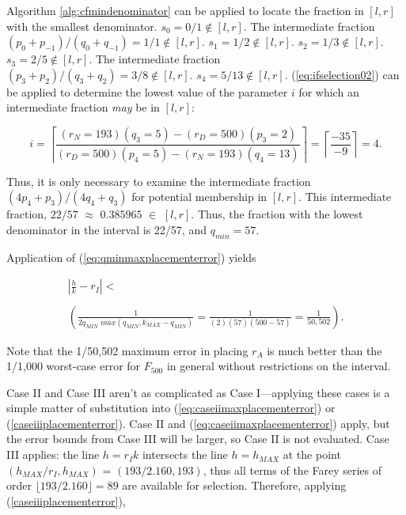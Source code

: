 \documentclass{esub2acm}
\begin{document}
Algorithm \ref{alg:cfmindenominator} can be applied to locate the fraction
in $[l,r]$ with the smallest denominator.  $s_0 =0/1 \notin [l,r]$.  The intermediate fraction
$(p_0 + p_{-1})/(q_0 + q_{-1})=1/1 \notin [l,r]$. $s_1 = 1/2 \notin [l,r]$.
$s_2 = 1/3 \notin [l,r]$.  $s_3 = 2/5 \notin [l,r]$.  The intermediate fraction
$(p_3 + p_2)/(q_3 + q_2)=3/8 \notin [l,r]$.  $s_4 = 5/13 \notin [l,r]$.
(\ref{eq:ifselection02}) can be applied to determine the lowest value of the
parameter $i$ for which an intermediate fraction \emph{may} be in $[l,r]$:

\begin{equation}
i = \left\lceil {
\frac
{(r_N = 193)(q_3 = 5) - (r_D = 500)(p_3=2)}
{(r_D=500)(p_4 = 5)-(r_N=193)(q_4=13)}
} \right\rceil
=
\left\lceil {\frac{-35}{-9}} \right\rceil = 4.
\end{equation}

Thus, it is only necessary to examine the intermediate fraction $(4 p_4 + p_3)/(4 q_4 + q_3)$
for potential membership in $[l,r]$.  This intermediate fraction, $22/57$ $\approx$ $0.385965$ $\in$ $[l,r]$.
Thus, the fraction with the lowest denominator in the interval is 22/57, and $q_{min} = 57$.

Application of (\ref{eq:qminmaxplacementerror}) yields

\begin{equation}
\begin{array}{l}
\displaystyle{\left| {\frac{h}{k} - r_I} \right| < } \\
\\
\displaystyle{\left({\frac{1}{2q_{MIN} \; max(q_{MIN}, k_{MAX}-q_{MIN})} = \frac{1}{(2)(57)(500-57)} = \frac{1}{50,502} } \right) .}
\end{array}
\end{equation}

Note that the 1/50,502 maximum error in placing $r_A$ is much better than the
1/1,000 worst-case error for $F_{500}$ in general without restrictions on
the interval.

Case II and Case III aren't as complicated as Case I---applying these
cases is a simple matter of substitution into (\ref{eq:caseiimaxplacementerror})
or (\ref{caseiiiplacementerror}).
Case II and
(\ref{eq:caseiimaxplacementerror}) apply, but the error bounds from
Case III will be larger, so Case II is not evaluated.
Case III applies: the line $h=r_I k$ intersects the line $h=h_{MAX}$ at
the point
$(h_{MAX}/r_I, h_{MAX})$ = $(193/2.160, 193)$, thus all terms
of the Farey series of order $\lfloor 193/2.160 \rfloor = 89$ are
available for selection.  Therefore, applying (\ref{caseiiiplacementerror}),
\end{document}
